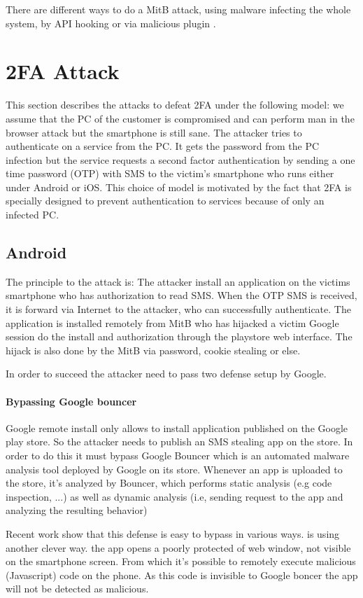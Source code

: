 \documentclass[11pt, a4paper,twocolumn]{article}
\begin{document}
There are different ways to do a MitB attack, using malware infecting the whole system, by API hooking or via malicious plugin \cite{mitb:1,mitb:2}.


\section{2FA Attack}
 This section describes the attacks to defeat 2FA under the following model: we assume that the PC of the customer is compromised and can perform man in the browser attack but the smartphone is still sane. The attacker tries to authenticate on a service from the PC. It gets the password from the PC infection but the service requests a second factor authentication by sending a one time password (OTP) with SMS to the victim's smartphone who runs either under Android or iOS. 
This choice of model is motivated by the fact that 2FA is specially designed to prevent authentication to services because of only an infected PC.
\subsection{Android}
The principle to the attack is: The attacker install an application on the victims smartphone who has authorization to read SMS. When the OTP SMS is received, it is forward via Internet to the attacker, who can successfully authenticate. The application is installed remotely from MitB who has hijacked a victim Google session do the install and authorization through the playstore web interface. The hijack is also done by the MitB via password, cookie stealing or else.

In order to succeed the attacker need to pass two defense setup by Google.

\paragraph{Bypassing Google bouncer} Google remote install only allows to install application published on the Google play store. So the attacker needs to publish an SMS stealing app on the store. In order to do this it must bypass Google Bouncer which is an automated malware analysis tool deployed by Google on its store. Whenever an app is uploaded to the store, it's analyzed by Bouncer, which performs static analysis (e.g code inspection, ...) as well as dynamic analysis (i.e, sending request to the app and analyzing the resulting behavior)

Recent work \cite{bouncer:1,bouncer:2} show that this defense is easy to bypass in various ways. \cite{Base} is using another clever way. the app opens a poorly protected of web window, not visible on the smartphone screen. From which it's possible to remotely execute malicious (Javascript) code on the phone. As this code is invisible to Google boncer the app will not be detected as malicious.
\end{document}

